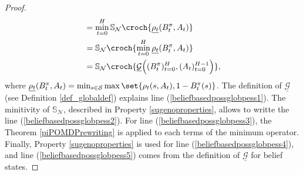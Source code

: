 \begin{proof}
\begin{align}
\label{beliefbasedpossglobpess3} &= \min_{t=0}^{H} \mathbb{S}_{\mathcal{N}} \croch{ \underline{\rho_t} (B^{\pi}_t, A_t) } \\
\label{beliefbasedpossglobpess4} &=  \mathbb{S}_{\mathcal{N}} \croch{ \min_{t=0}^{H} \underline{\rho_t} (B^{\pi}_t, A_t) } \\
\label{beliefbasedpossglobpess5} &= \mathbb{S}_{\mathcal{N}} \croch{ \underline{\mathcal{G}} \Big( (B^{\pi}_t)_{t=0}^{H},  (A_t)_{t=0}^{H-1} \Big)  },
\end{align}
where $\underline{\rho_t}(B^{\pi}_t,A_t) = \min_{s \in \mathcal{S}} \max \set{ \rho_t(s,A_t), 1 - B^{\pi}_t(s) }$.
The definition of $\underline{\mathcal{G}}$ 
(see Definition \ref{def_globaldef})
explains line (\ref{beliefbasedpossglobpess1}).
The minitivity of $\mathbb{S}_{\mathcal{N}}$,
described in Property \ref{sugenoproperties},
allows to writte the line (\ref{beliefbasedpossglobpess2}). 
For line (\ref{beliefbasedpossglobpess3}), 
the Theorem \ref{piPOMDPrewriting} is applied to each
terms of the minimum operator.
Finally, Property \ref{sugenoproperties} is used for line (\ref{beliefbasedpossglobpess4}),
and line (\ref{beliefbasedpossglobpess5}) comes from the definition of
$\underline{\mathcal{G}}$ for belief states.
\end{proof}

